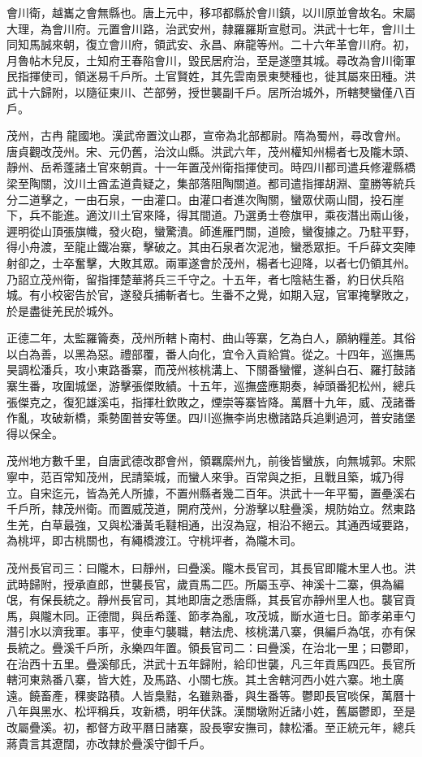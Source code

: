 \begin{pinyinscope}
會川衛，越巂之會無縣也。唐上元中，移邛都縣於會川鎮，以川原並會故名。宋屬大理，為會川府。元置會川路，治武安州，隸羅羅斯宣慰司。洪武十七年，會川土同知馬誠來朝，復立會川府，領武安、永昌、麻龍等州。二十六年革會川府。初，月魯帖木兒反，土知府王春陷會川，毀民居府治，至是遂墮其城。尋改為會川衛軍民指揮使司，領迷易千戶所。土官賢姓，其先雲南景東僰種也，徙其屬來田種。洪武十六歸附，以隨征東川、芒部勞，授世襲副千戶。居所治城外，所轄僰蠻僅八百戶。

茂州，古冉龍國地。漢武帝置汶山郡，宣帝為北部都尉。隋為蜀州，尋改會州。唐貞觀改茂州。宋、元仍舊，治汶山縣。洪武六年，茂州權知州楊者七及隴木頭、靜州、岳希蓬諸土官來朝貢。十一年置茂州衛指揮使司。時四川都司遣兵修灌縣橋梁至陶關，汶川土酋孟道貴疑之，集部落阻陶關道。都司遣指揮胡淵、童勝等統兵分二道擊之，一由石泉，一由灌口。由灌口者進次陶關，蠻眾伏兩山間，投石崖下，兵不能進。適汶川土官來降，得其間道。乃選勇士卷旗甲，乘夜潛出兩山後，遲明從山頂張旗幟，發火砲，蠻驚潰。師進雁門關，道險，蠻復據之。乃駐平野，得小舟渡，至龍止鐵冶寨，擊破之。其由石泉者次泥池，蠻悉眾拒。千戶薛文突陣射卻之，士卒奮擊，大敗其眾。兩軍遂會於茂州，楊者七迎降，以者七仍領其州。乃詔立茂州衛，留指揮楚華將兵三千守之。十五年，者七陰結生番，約日伏兵陷城。有小校密告於官，遂發兵捕斬者七。生番不之覺，如期入寇，官軍掩擊敗之，於是盡徙羌民於城外。

正德二年，太監羅籥奏，茂州所轄卜南村、曲山等寨，乞為白人，願納糧差。其俗以白為善，以黑為惡。禮部覆，番人向化，宜令入貢給賞。從之。十四年，巡撫馬昊調松潘兵，攻小東路番寨，而茂州核桃溝上、下關番蠻懼，遂糾白石、羅打鼓諸寨生番，攻圍城堡，游擊張傑敗績。十五年，巡撫盛應期奏，綽頭番犯松州，總兵張傑克之，復犯雄溪屯，指揮杜欽敗之，煙崇等寨皆降。萬曆十九年，威、茂諸番作亂，攻破新橋，乘勢圍普安等堡。四川巡撫李尚忠檄諸路兵追剿過河，普安諸堡得以保全。

茂州地方數千里，自唐武德改郡會州，領羈縻州九，前後皆蠻族，向無城郭。宋熙寧中，范百常知茂州，民請築城，而蠻人來爭。百常與之拒，且戰且築，城乃得立。自宋迄元，皆為羌人所據，不置州縣者幾二百年。洪武十一年平蜀，置壘溪右千戶所，隸茂州衛。而置威茂道，開府茂州，分游擊以駐疊溪，規防始立。然東路生羌，白草最強，又與松潘黃毛韃相通，出沒為寇，相沿不絕云。其通西域要路，為桃坪，即古桃關也，有繩橋渡江。守桃坪者，為隴木司。

茂州長官司三：曰隴木，曰靜州，曰疊溪。隴木長官司，其長官即隴木里人也。洪武時歸附，授承直郎，世襲長官，歲貢馬二匹。所屬玉亭、神溪十二寨，俱為編氓，有保長統之。靜州長官司，其地即唐之悉唐縣，其長官亦靜州里人也。襲官貢馬，與隴木同。正德間，與岳希蓬、節孝為亂，攻茂城，斷水道七日。節孝弟車勺潛引水以濟我軍。事平，使車勺襲職，轄法虎、核桃溝八寨，俱編戶為氓，亦有保長統之。疊溪千戶所，永樂四年置。領長官司二：曰疊溪，在治北一里；曰鬱即，在治西十五里。疊溪郁氏，洪武十五年歸附，給印世襲，凡三年貢馬四匹。長官所轄河東熟番八寨，皆大姓，及馬路、小關七族。其土舍轄河西小姓六寨。地土廣遠。饒畜產，稞麥路積。人皆梟黠，名雖熟番，與生番等。鬱即長官啖保，萬曆十八年與黑水、松坪稱兵，攻新橋，明年伏誅。漢關墩附近諸小姓，舊屬鬱即，至是改屬疊溪。初，都督方政平曆日諸寨，設長寧安撫司，隸松潘。至正統元年，總兵蔣貴言其遼闊，亦改隸於疊溪守御千戶。


\end{pinyinscope}
